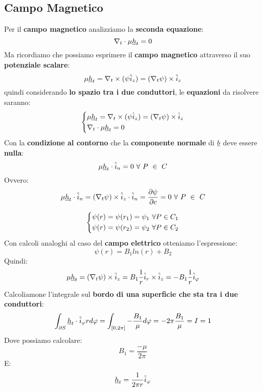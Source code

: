 \subsection{Campo Magnetico}
Per il \textbf{campo magnetico} analizziamo la \textbf{seconda equazione}:
\begin{equation*}
    \nabla_t \cdot \mu \underline{h}_t = 0 
\end{equation*}
Ma ricordiamo che possiamo esprimere il \textbf{campo magnetico} attraverso il suo \textbf{potenziale scalare}:
\begin{equation*}
    \mu \underline{h}_t = \nabla_t \times (\psi \hat{i}_z) = (\nabla_t \psi) \times \hat{i}_z
\end{equation*}
quindi considerando \textbf{lo spazio tra i due conduttori}, le \textbf{equazioni} da risolvere saranno:
\begin{equation*}
    \begin{dcases}
         \mu \underline{h}_t = \nabla_t \times (\psi \hat{i}_z) = (\nabla_t \psi) \times \hat{i}_z\\
         \nabla_t \cdot \mu \underline{h}_t = 0 
    \end{dcases}
\end{equation*}
Con la \textbf{condizione al contorno} che la \textbf{componente normale} di $\underline{b}$ deve essere \textbf{nulla}:
\begin{equation*}
    \mu \underline{h}_t \cdot \hat{i}_n = 0 \ \forall \ P \ \in \ C
\end{equation*}
Ovvero:
\begin{equation*}
    \mu \underline{h}_t \cdot \hat{i}_n =  (\nabla_t \psi) \times \hat{i}_z \cdot \hat{i}_n = \frac{\partial \psi}{\partial c} = 0 \ \forall \ P \ \in \ C
\end{equation*}

\begin{equation*}
    \begin{dcases}
        \psi(r) = \psi(r_1) = \psi_1 \ \forall P \in C_1\\
        \psi(r) = \psi(r_2) = \psi_2 \ \forall P \in C_2
    \end{dcases}
\end{equation*}
Con calcoli analoghi al caso del \textbf{campo elettrico} otteniamo l'espressione:
\begin{equation*}
    \psi(r) = B_1 ln(r) + B_2
\end{equation*}
Quindi:
\begin{equation*}
    \mu \underline{h}_t = (\nabla_t \psi) \times \hat{i}_z = B_1 \frac{1}{r} \hat{i}_r \times \hat{i}_z = - B_1 \frac{1}{r} \hat{i}_{\varphi}
\end{equation*}
Calcoliamone l'integrale sul \textbf{bordo di una superficie che sta tra i due conduttori}:
\begin{equation*}
    \int_{\partial S} \underline{h}_t \cdot \hat{i}_{\varphi} r d\varphi = \int_{[0,2\pi]} - \frac{B_1}{\mu} d\varphi = -2\pi \frac{B_1}{\mu} = I = 1
\end{equation*}
Dove possiamo calcolare:
\begin{equation*}
    B_1 = \frac{-\mu}{2\pi}
\end{equation*}
E:
\begin{equation*}
    \underline{h}_t = \frac{1}{2\pi r} \hat{i}_{\varphi}
\end{equation*}


